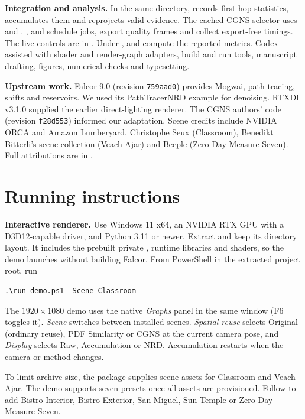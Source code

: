 \documentclass[a4paper,twocolumn]{article}
\begin{document}
\textbf{Integration and analysis.} In the same directory,  records first-hop statistics,  accumulates them and  reprojects valid evidence. The cached CGNS selector uses  and . ,  and  schedule jobs, export quality frames and collect export-free timings. The live controls are in . Under ,  and  compute the reported metrics. Codex assisted with shader and render-graph adapters, build and run tools, manuscript drafting, figures, numerical checks and typesetting.

\textbf{Upstream work.} Falcor 9.0 (revision \texttt{759aad0}) provides Mogwai, path tracing, shifts and reservoirs. We used its PathTracerNRD example for denoising. RTXDI v3.1.0 supplied the earlier direct-lighting renderer. The CGNS authors' code (revision \texttt{f28d553}) informed our adaptation. Scene credits include NVIDIA ORCA and Amazon Lumberyard, Christophe Seux (Classroom), Benedikt Bitterli's scene collection (Veach Ajar) and Beeple (Zero Day Measure Seven). Full attributions are in .

\newpage
\section{Running instructions}
\textbf{Interactive renderer.} Use Windows 11 x64, an NVIDIA RTX GPU with a D3D12-capable driver, and Python 3.11 or newer. Extract  and keep its directory layout. It includes the prebuilt private , runtime libraries and shaders, so the demo launches without building Falcor. From PowerShell in the extracted project root, run
\begin{verbatim}
.\run-demo.ps1 -Scene Classroom
\end{verbatim}
The $1920\times1080$ demo uses the native \emph{Graphs} panel in the same window (F6 toggles it). \emph{Scene} switches between installed scenes. \emph{Spatial reuse} selects Original (ordinary reuse), PDF Similarity or CGNS at the current camera pose, and \emph{Display} selects Raw, Accumulation or NRD. Accumulation restarts when the camera or method changes.

To limit archive size, the package supplies scene assets for Classroom and Veach Ajar. The demo supports seven presets once all assets are provisioned. Follow  to add Bistro Interior, Bistro Exterior, San Miguel, Sun Temple or Zero Day Measure Seven.
\end{document}
